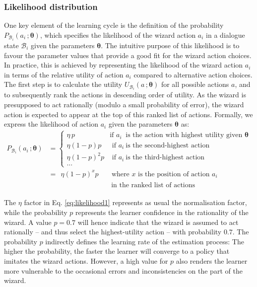 \subsubsection*{Likelihood distribution}
One key element of the learning cycle is the definition of the probability $P_{\mathcal{B}_i}(a_i\,; \boldsymbol\theta)$, which specifies the likelihood of the wizard action $a_i$ in a dialogue state $\mathcal{B}_i$ given the parameters $\boldsymbol\theta$. The intuitive purpose of this likelihood is to favour the parameter values that provide a good fit for the wizard action choices. In practice, this is achieved by representing the likelihood of the wizard action $a_i$ in terms of the relative utility of action $a_i$ compared to alternative action choices. The first step is to calculate the utility $U_{\mathcal{B}_i}(a\,; \boldsymbol\theta)$ for all possible actions $a$, and to subsequently rank the actions in descending order of utility.  As the wizard is presupposed to act rationally (modulo a small probability of error), the wizard action is expected to appear at the top of this ranked list of actions. Formally, we express the likelihood of action $a_i$ given the parameters $\boldsymbol\theta$ as:
\begin{align}
P_{\mathcal{B}_i}(a_i\,; \boldsymbol\theta) & = \begin{cases} \eta \, p & \text{if } a_i \ \text{ is the action with highest utility given } \boldsymbol\theta  \\
\eta (1-p) p & \text{ if } a_i \ \text{is the second-highest action} \\
\eta (1-p)^2 p & \text{ if } a_i \ \text{is the third-highest action} \\ 
\dots
\end{cases} \nonumber \\[1mm]
& = \ \ \eta (1-p)^x p \ \ \ \ \ \ \ \text{ where } x \text{ is the position of action } a_i \label{eq:likelihood1} \\
&  \phantom{= (1-p)^x p} \ \ \ \ \ \ \ \ \ \ \ \text{ in the ranked list of actions}  \nonumber
\end{align}

The $\eta$ factor in Eq. \eqref{eq:likelihood1} represents as usual the normalisation factor, while the probability $p$  represents the learner confidence in the rationality  of the wizard.  A value $p = 0.7$ will hence indicate that the wizard is assumed to act rationally -- and thus select the highest-utility action -- with probability $0.7$. The probability $p$ indirectly defines the learning rate of the estimation process: The higher the probability, the faster the learner will converge to a policy that imitates the wizard actions.  However, a high value for $p$ also renders the learner more vulnerable to the occasional errors and inconsistencies on the part of the wizard. 


